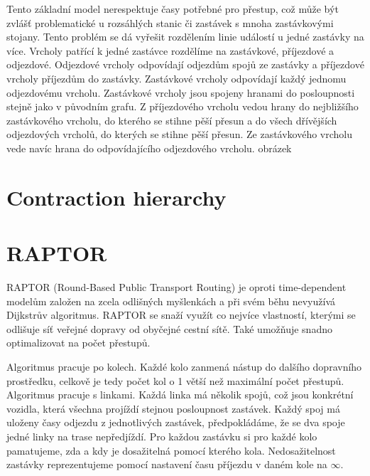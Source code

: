 Tento základní model nerespektuje časy potřebné pro přestup, což může být
zvlášť problematické u rozsáhlých stanic či zastávek s mnoha zastávkovými
stojany. Tento problém se dá vyřešit rozdělením linie událostí u jedné zastávky
na více. Vrcholy patřící k jedné zastávce rozdělíme na zastávkové, příjezdové a
odjezdové. Odjezdové vrcholy odpovídají odjezdům spojů ze zastávky a příjezdové
vrcholy příjezdům do zastávky. Zastávkové vrcholy odpovídají každý jednomu
odjezdovému vrcholu. Zastávkové vrcholy jsou spojeny hranami do posloupnosti
stejně jako v původním grafu. Z příjezdového vrcholu vedou hrany do nejbližšího
zastávkového vrcholu, do kterého se stihne pěší přesun a do všech dřívějších
odjezdových vrcholů, do kterých se stihne pěší přesun. Ze zastávkového vrcholu
vede navíc hrana do odpovídajícího odjezdového vrcholu. 
\TODO obrázek
\section{Contraction hierarchy}
\section{RAPTOR}
RAPTOR (Round-Based Public Transport Routing) \citep*{RAPTOR} je oproti
time-dependent modelům založen na zcela odlišných myšlenkách a při svém běhu
nevyužívá Dijkstrův algoritmus. RAPTOR se snaží využít co nejvíce vlastností,
kterými se odlišuje síť veřejné dopravy od obyčejné cestní sítě. Také umožňuje
snadno optimalizovat na počet přestupů.

Algoritmus pracuje po kolech. Každé kolo zanmená nástup do dalšího dopravního
prostředku, celkově je tedy počet kol o 1 větší než maximální počet přestupů.
Algoritmus pracuje s linkami. Každá linka má několik spojů, což jsou konkrétní
vozidla, která všechna projíždí stejnou posloupnost zastávek. Každý spoj má
uloženy časy odjezdu z jednotlivých zastávek, předpokládáme, že se dva spoje
jedné linky na trase nepředjíždí. Pro každou zastávku si pro každé kolo
pamatujeme, zda a kdy je dosažitelná pomocí kterého kola. Nedosažitelnost
zastávky reprezentujeme pomocí nastavení času příjezdu v daném kole na $\infty$.


